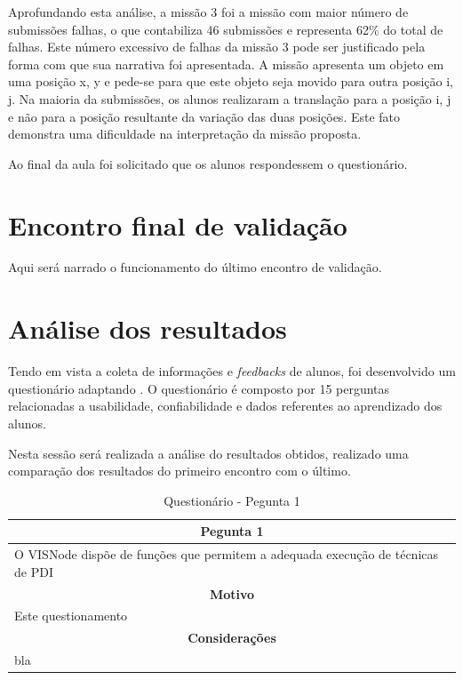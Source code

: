 \documentclass[
	12pt,				%
	oneside,			%
	a4paper,			%
	english,			%
	french,				%
	spanish,			%
	brazil,				%
	]{abntex2}
\begin{document}
Aprofundando esta análise, a missão 3 foi a missão com maior número de submissões falhas, o que contabiliza 46 submissões e representa 62\% do total de falhas. Este número excessivo de falhas da missão 3 pode ser justificado pela forma com que sua narrativa foi apresentada. A missão apresenta um objeto em uma posição x, y e pede-se para que este objeto seja movido para outra posição i, j. Na maioria da submissões, os alunos realizaram a translação para a posição i, j e não para a posição resultante da variação das duas posições. Este fato demonstra uma dificuldade na interpretação da missão proposta.

Ao final da aula foi solicitado que os alunos respondessem o questionário.

\section{Encontro final de validação}

Aqui será narrado o funcionamento do último encontro de validação.

\section{Análise dos resultados}

Tendo em vista a coleta de informações e \textit{feedbacks} de alunos, foi desenvolvido um questionário adaptando \cite{bez2013}. O questionário é composto por 15 perguntas relacionadas a usabilidade, confiabilidade e dados referentes ao aprendizado dos alunos. 

Nesta sessão será realizada a análise do resultados obtidos, realizado uma comparação dos resultados do primeiro encontro com o último.

\begin{table}[H]
\centering
\caption{Questionário - Pegunta 1} 
\def\arraystretch{1.5}
\begin{tabular}{l}
\hline
\multicolumn{1}{c}{\textbf{Pegunta 1}}              \\ \hline
O VISNode dispõe de funções que permitem a adequada execução de técnicas de PDI \\ \hline
\multicolumn{1}{c}{\textbf{Motivo}}                 \\ \hline
Este questionamento                                   \\ \hline
\multicolumn{1}{c}{\textbf{Considerações}}          \\ \hline
bla                                                   \\ \hline
\end{tabular}
\sourceAuthor
\end{table}
\end{document}
